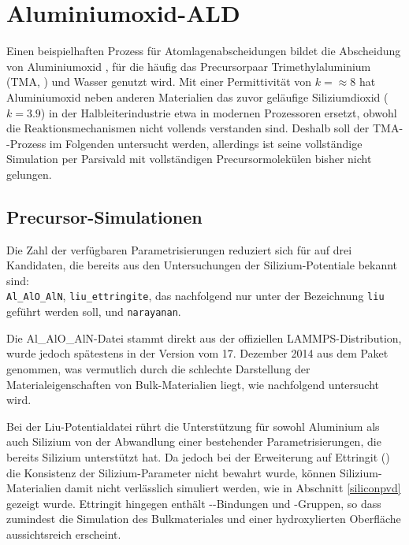 \section{Aluminiumoxid-ALD}
\label{aluminaald}

Einen beispielhaften Prozess für Atomlagenabscheidungen bildet die Abscheidung von Aluminiumoxid \cite{puurunen_surface_2005}, für die häufig das Precursorpaar Trimethylaluminium (TMA, ) und Wasser genutzt wird.
Mit einer Permittivität von $k=\approx 8$ hat Aluminiumoxid neben anderen Materialien das zuvor geläufige Siliziumdioxid ($k=3.9$) in der Halbleiterindustrie etwa in modernen Prozessoren ersetzt, obwohl die Reaktionsmechanismen nicht vollends verstanden sind.
Deshalb soll der TMA--Prozess im Folgenden untersucht werden, allerdings ist seine vollständige Simulation per Parsivald mit vollständigen Precursormolekülen bisher nicht gelungen.

\subsection{Precursor-Simulationen}

Die Zahl der verfügbaren Parametrisierungen reduziert sich für  auf drei Kandidaten, die bereits aus den Untersuchungen der Silizium-Potentiale bekannt sind:\\
\texttt{Al\_AlO\_AlN}, \texttt{liu\_ettringite}, das nachfolgend nur unter der Bezeichnung \texttt{liu} geführt werden soll, und \texttt{narayanan}.

Die Al\_AlO\_AlN-Datei stammt direkt aus der offiziellen LAMMPS-Distribution, wurde jedoch spätestens in der Version vom 17. Dezember 2014 aus dem Paket genommen, was vermutlich durch die schlechte Darstellung der Materialeigenschaften von Bulk-Materialien liegt, wie nachfolgend untersucht wird.

Bei der Liu-Potentialdatei rührt die Unterstützung für sowohl Aluminium als auch Silizium von der Abwandlung einer bestehender Parametrisierungen, die bereits Silizium unterstützt hat.
Da jedoch bei der Erweiterung auf Ettringit () die Konsistenz der Silizium-Parameter nicht bewahrt wurde, können Silizium-Materialien damit nicht verlässlich simuliert werden, wie in Abschnitt \ref{siliconpvd} gezeigt wurde.
Ettringit hingegen enthält --Bindungen und -Gruppen, so dass zumindest die Simulation des Bulkmateriales und einer hydroxylierten Oberfläche aussichtsreich erscheint.

